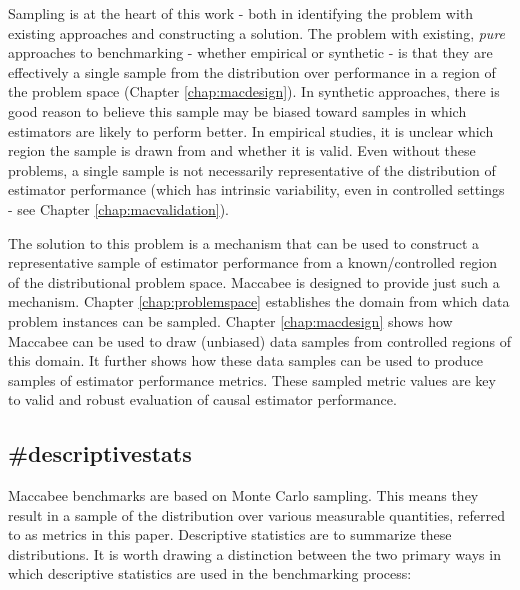 \documentclass[./main.tex]{subfiles}
\begin{document}
Sampling is at the heart of this work - both in identifying the problem with existing approaches and constructing a solution. The problem with existing, \textit{pure} approaches to benchmarking - whether empirical or synthetic - is that they are effectively a single sample from the distribution over performance in a region of the problem space (Chapter \ref{chap:macdesign}). In synthetic approaches, there is good reason to believe this sample may be biased toward samples in which estimators are likely to perform better. In empirical studies, it is unclear which region the sample is drawn from and whether it is valid. Even without these problems, a single sample is not necessarily representative of the distribution of estimator performance (which has intrinsic variability, even in controlled settings - see Chapter \ref{chap:macvalidation}).

\vspace{\baselineskip}

The solution to this problem is a mechanism that can be used to construct a representative sample of estimator performance from a known/controlled region of the distributional problem space. Maccabee is designed to provide just such a mechanism. Chapter \ref{chap:problemspace} establishes the domain from which data problem instances can be sampled. Chapter \ref{chap:macdesign} shows how Maccabee can be used to draw (unbiased) data samples from controlled regions of this domain. It further shows how these data samples can be used to produce samples of estimator performance metrics. These sampled metric values are key to valid and robust evaluation of causal estimator performance.


\subsection{\textbf{\#descriptivestats}}
\label{hc:descriptivestats}

Maccabee benchmarks are based on Monte Carlo sampling. This means they result in a sample of the distribution over various measurable quantities, referred to as metrics in this paper. Descriptive statistics are to summarize these distributions. It is worth drawing a distinction between the two primary ways in which descriptive statistics are used in the benchmarking process:
\end{document}
